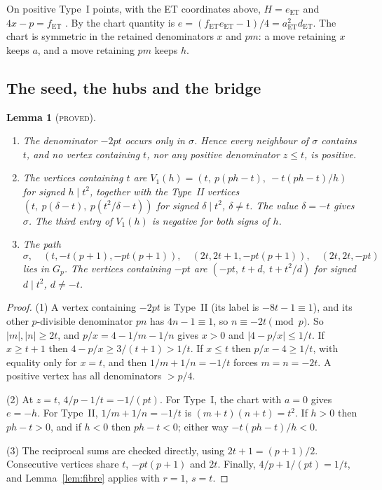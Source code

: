 \documentclass[11pt,reqno]{amsart}
\newtheorem{lemma}[theorem]{Lemma}
\theoremstyle{definition}
\newcommand{\status}[1]{\textsc{#1}}
\begin{document}
On positive Type~I points, with the ET coordinates above,
$H=e_{\mathrm{ET}}$ and $4x-p=f_{\mathrm{ET}}$ \cite[(2.1), (2.6)]{ET}.  By
\cite[(2.7)]{ET} the chart quantity is
$e=(f_{\mathrm{ET}}e_{\mathrm{ET}}-1)/4=a_{\mathrm{ET}}^2d_{\mathrm{ET}}$.  The chart is symmetric in the retained denominators $x$
and $pm$: a move retaining $x$ keeps $a$, and a move retaining $pm$ keeps
$h$.

\subsection{The seed, the hubs and the bridge}

\begin{lemma}[\status{proved}]\label{lem:seed}
\leavevmode
\begin{enumerate}
\item The denominator $-2pt$ occurs only in $\sigma$.  Hence every neighbour
of $\sigma$ contains $t$, and no vertex containing $t$, nor any positive
denominator $z\le t$, is positive.
\item The vertices containing $t$ are
$V_1(h)=(t,\ p(ph-t),\ -t(ph-t)/h)$ for signed $h\mid t^2$, together with
the Type~II vertices $(t,\ p(\delta-t),\ p(t^2/\delta-t))$ for signed
$\delta\mid t^2$, $\delta\ne t$.  The value $\delta=-t$ gives $\sigma$.
The third entry of $V_1(h)$ is negative for both signs of $h$.
\item The path
\[
 \sigma,\quad(t,-t(p+1),-pt(p+1)),\quad(2t,2t+1,-pt(p+1)),\quad(2t,2t,-pt)
\]
lies in $G_p$.  The vertices containing $-pt$ are
$(-pt,\ t+d,\ t+t^2/d)$ for signed $d\mid t^2$, $d\ne-t$.
\end{enumerate}
\end{lemma}

\begin{proof}
(1) A vertex containing $-2pt$ is Type~II (its label is $-8t-1\equiv1$),
and its other $p$-divisible denominator $pn$ has $4n-1\equiv1$, so
$n\equiv-2t\pmod p$.  So $|m|,|n|\ge2t$, and $p/x=4-1/m-1/n$ gives
$x>0$ and $|4-p/x|\le1/t$.  If $x\ge t+1$ then
$4-p/x\ge3/(t+1)>1/t$.  If $x\le t$ then $p/x-4\ge1/t$, with equality only
for $x=t$, and then $1/m+1/n=-1/t$ forces $m=n=-2t$.  A positive vertex has
all denominators $>p/4$.

(2) At $z=t$, $4/p-1/t=-1/(pt)$.  For Type~I, the chart with $a=0$ gives
$e=-h$.  For Type~II, $1/m+1/n=-1/t$ is $(m+t)(n+t)=t^2$.  If $h>0$ then
$ph-t>0$, and if $h<0$ then $ph-t<0$; either way $-t(ph-t)/h<0$.

(3) The reciprocal sums are checked directly, using $2t+1=(p+1)/2$.
Consecutive vertices share $t$, $-pt(p+1)$ and $2t$.  Finally,
$4/p+1/(pt)=1/t$, and Lemma~\ref{lem:fibre} applies with $r=1$, $s=t$.
\end{proof}
\end{document}
